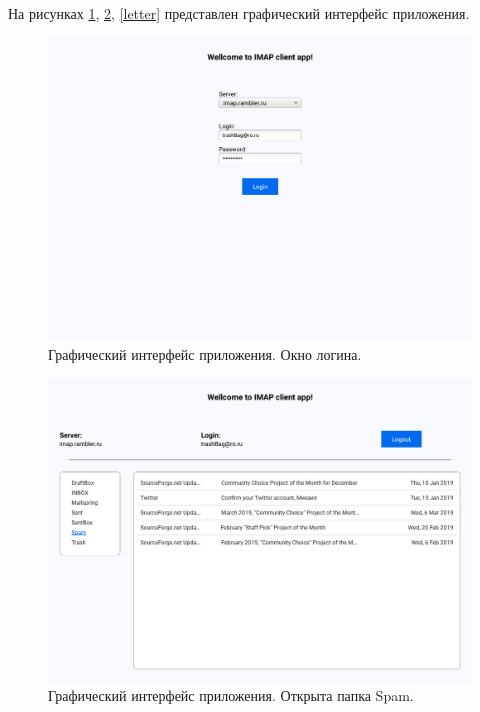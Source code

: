 \documentclass[a4paper,14pt]{extarticle}
\begin{document}
На рисунках \ref{login}, \ref{spam}, \ref{letter} представлен графический интерфейс приложения.

\begin{figure}[H]
	\begin{center}
		\includegraphics[scale=0.4]{pics/login}
		\caption{Графический интерфейс приложения. Окно логина.}
		\label{login}
	\end{center}
\end{figure}

\begin{figure}[H]
	\begin{center}
		\includegraphics[scale=0.4]{pics/spam}
		\caption{Графический интерфейс приложения. Открыта папка Spam.}
		\label{spam}
	\end{center}
\end{figure}
\end{document}
